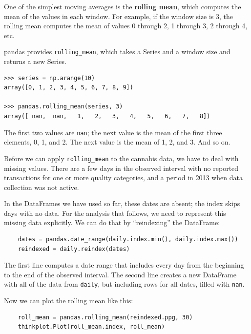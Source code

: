 \documentclass[12pt]{book}
\theoremstyle{exercise}
\begin{document}
One of the simplest moving averages is the {\bf rolling mean}, which
computes the mean of the values in each window.  For example, if
the window size is 3, the rolling mean computes the mean of
values 0 through 2, 1 through 3, 2 through 4, etc.%
%

pandas provides \verb"rolling_mean", which takes a Series and a
window size and returns a new Series.%
%

\begin{verbatim}
>>> series = np.arange(10)
array([0, 1, 2, 3, 4, 5, 6, 7, 8, 9])

>>> pandas.rolling_mean(series, 3)
array([ nan,  nan,   1,   2,   3,   4,   5,   6,   7,   8])
\end{verbatim}

The first two values are {\tt nan}; the next value is the mean of
the first three elements, 0, 1, and 2.  The next value is the mean
of 1, 2, and 3.  And so on.

Before we can apply \verb"rolling_mean" to the cannabis data, we
have to deal with missing values.  There are a few days in the
observed interval with no reported transactions for one or more
quality categories, and a period in 2013 when data collection was
not active.%

In the DataFrames we have used so far, these dates are absent;
the index skips days with no data.  For the analysis that follows,
we need to represent this missing data explicitly.  We can do
that by ``reindexing'' the DataFrame:%
%

\begin{verbatim}
    dates = pandas.date_range(daily.index.min(), daily.index.max())
    reindexed = daily.reindex(dates)
\end{verbatim}

The first line computes a date range that includes every day from the
beginning to the end of the observed interval.  The second line
creates a new DataFrame with all of the data from {\tt daily}, but
including rows for all dates, filled with {\tt nan}.%
%

Now we can plot the rolling mean like this:

\begin{verbatim}
    roll_mean = pandas.rolling_mean(reindexed.ppg, 30)
    thinkplot.Plot(roll_mean.index, roll_mean)
\end{verbatim}
\end{document}
